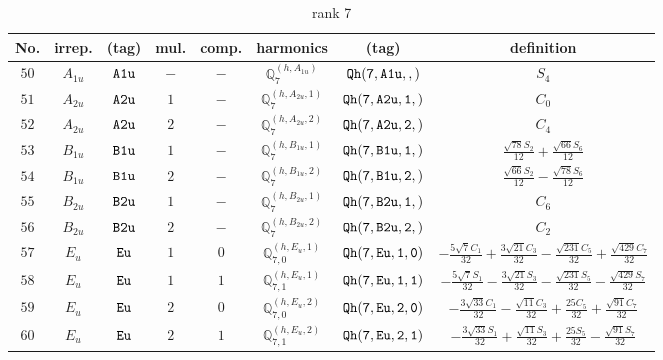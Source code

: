 \documentclass[fleqn,8pt]{jsarticle}
\begin{document}
\begin{table}[ht!]
\begin{center}
\caption{rank 7}
\renewcommand{\arraystretch}{1.3}
\begin{tabular}{cccccccc} \hline \hline
No. & irrep. & (tag) & mul. & comp. & harmonics & (tag) & definition \\ \hline
$ 50 $ & $ A_{1u} $ & $ {\tt A1u} $ & $ - $ & $ - $ & $ \mathbb{Q}_{7}^{(h,A_{1u})} $ & $ {\tt Qh(7,A1u,,)} $ & $ S_{4} $ \\
$ 51 $ & $ A_{2u} $ & $ {\tt A2u} $ & $ 1 $ & $ - $ & $ \mathbb{Q}_{7}^{(h,A_{2u},1)} $ & $ {\tt Qh(7,A2u,1,)} $ & $ C_{0} $ \\
$ 52 $ & $ A_{2u} $ & $ {\tt A2u} $ & $ 2 $ & $ - $ & $ \mathbb{Q}_{7}^{(h,A_{2u},2)} $ & $ {\tt Qh(7,A2u,2,)} $ & $ C_{4} $ \\
$ 53 $ & $ B_{1u} $ & $ {\tt B1u} $ & $ 1 $ & $ - $ & $ \mathbb{Q}_{7}^{(h,B_{1u},1)} $ & $ {\tt Qh(7,B1u,1,)} $ & $ \frac{\sqrt{78} S_{2}}{12} + \frac{\sqrt{66} S_{6}}{12} $ \\
$ 54 $ & $ B_{1u} $ & $ {\tt B1u} $ & $ 2 $ & $ - $ & $ \mathbb{Q}_{7}^{(h,B_{1u},2)} $ & $ {\tt Qh(7,B1u,2,)} $ & $ \frac{\sqrt{66} S_{2}}{12} - \frac{\sqrt{78} S_{6}}{12} $ \\
$ 55 $ & $ B_{2u} $ & $ {\tt B2u} $ & $ 1 $ & $ - $ & $ \mathbb{Q}_{7}^{(h,B_{2u},1)} $ & $ {\tt Qh(7,B2u,1,)} $ & $ C_{6} $ \\
$ 56 $ & $ B_{2u} $ & $ {\tt B2u} $ & $ 2 $ & $ - $ & $ \mathbb{Q}_{7}^{(h,B_{2u},2)} $ & $ {\tt Qh(7,B2u,2,)} $ & $ C_{2} $ \\
$ 57 $ & $ E_{u} $ & $ {\tt Eu} $ & $ 1 $ & $ 0 $ & $ \mathbb{Q}_{7,0}^{(h,E_{u},1)} $ & $ {\tt Qh(7,Eu,1,0)} $ & $ - \frac{5 \sqrt{7} C_{1}}{32} + \frac{3 \sqrt{21} C_{3}}{32} - \frac{\sqrt{231} C_{5}}{32} + \frac{\sqrt{429} C_{7}}{32} $ \\
$ 58 $ & $ E_{u} $ & $ {\tt Eu} $ & $ 1 $ & $ 1 $ & $ \mathbb{Q}_{7,1}^{(h,E_{u},1)} $ & $ {\tt Qh(7,Eu,1,1)} $ & $ - \frac{5 \sqrt{7} S_{1}}{32} - \frac{3 \sqrt{21} S_{3}}{32} - \frac{\sqrt{231} S_{5}}{32} - \frac{\sqrt{429} S_{7}}{32} $ \\
$ 59 $ & $ E_{u} $ & $ {\tt Eu} $ & $ 2 $ & $ 0 $ & $ \mathbb{Q}_{7,0}^{(h,E_{u},2)} $ & $ {\tt Qh(7,Eu,2,0)} $ & $ - \frac{3 \sqrt{33} C_{1}}{32} - \frac{\sqrt{11} C_{3}}{32} + \frac{25 C_{5}}{32} + \frac{\sqrt{91} C_{7}}{32} $ \\
$ 60 $ & $ E_{u} $ & $ {\tt Eu} $ & $ 2 $ & $ 1 $ & $ \mathbb{Q}_{7,1}^{(h,E_{u},2)} $ & $ {\tt Qh(7,Eu,2,1)} $ & $ - \frac{3 \sqrt{33} S_{1}}{32} + \frac{\sqrt{11} S_{3}}{32} + \frac{25 S_{5}}{32} - \frac{\sqrt{91} S_{7}}{32} $ \\

\end{tabular}
\end{center}
\end{table}
\end{document}
